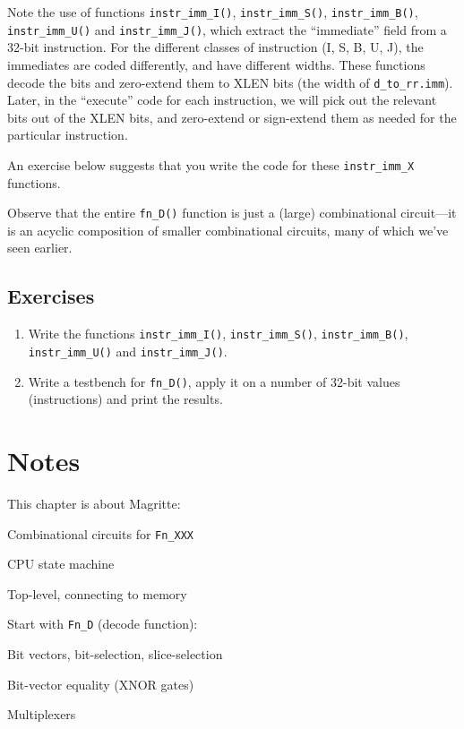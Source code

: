 Note the use of functions \verb|instr_imm_I()|, \verb|instr_imm_S()|,
\verb|instr_imm_B()|, \verb|instr_imm_U()| and \verb|instr_imm_J()|,
which extract the ``immediate'' field from a 32-bit instruction.  For
the different classes of instruction (I, S, B, U, J), the immediates
are coded differently, and have different widths.  These functions
decode the bits and zero-extend them to XLEN bits (the width of
\verb|d_to_rr.imm|).  Later, in the ``execute'' code for each
instruction, we will pick out the relevant bits out of the XLEN bits,
and zero-extend or sign-extend them as needed for the particular
instruction.

An exercise below suggests that you write the code for these
\verb|instr_imm_X| functions.

Observe that the entire \verb|fn_D()| function is just a (large)
combinational circuit---it is an acyclic composition of smaller
combinational circuits, many of which we've seen earlier.


\subsection{Exercises}

\begin{enumerate}

\item Write the functions \verb|instr_imm_I()|, \verb|instr_imm_S()|,
  \verb|instr_imm_B()|, \verb|instr_imm_U()| and \verb|instr_imm_J()|.

\item Write a testbench for \verb|fn_D()|, apply it on a number of
  32-bit values (instructions) and print the results.

\end{enumerate}


\section{Notes}

This chapter is about Magritte:

\begin{tightlist}

\item Combinational circuits for \verb|Fn_XXX|

\item CPU state machine

\item Top-level, connecting to memory

\end{tightlist}

Start with \verb|Fn_D| (decode function):
\begin{tightlist}

\item Bit vectors, bit-selection, slice-selection

\item Bit-vector equality (XNOR gates)

\item Multiplexers

\end{tightlist}

